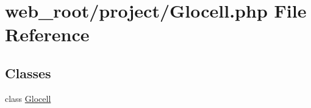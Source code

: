 \hypertarget{Glocell_8php}{}\section{web\+\_\+root/project/\+Glocell.php File Reference}
\label{Glocell_8php}
\subsection*{Classes}
\begin{DoxyCompactItemize}
\item 
class \hyperlink{classGlocell}{Glocell}
\end{DoxyCompactItemize}
